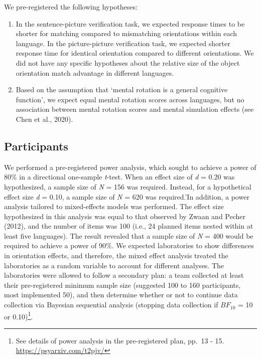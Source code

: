 \documentclass[
  man,floatsintext]{apa7}
\begin{document}
We pre-registered the following hypotheses:

\begin{enumerate}
\def\labelenumi{(\arabic{enumi})}
\item
  In the sentence-picture verification task, we expected response
  times to be shorter for matching compared to mismatching
  orientations within each language. In the picture-picture
  verification task, we expected shorter response time for identical
  orientation compared to different orientations. We did not have any
  specific hypotheses about the relative size of the object
  orientation match advantage in different languages.
\item
  Based on the assumption that `mental rotation is a general cognitive
  function', we expect equal mental rotation scores across languages,
  but no association between mental rotation scores and mental
  simulation effects (see Chen et al., 2020).
\end{enumerate}

\hypertarget{participants}{%
\subsection{Participants}\label{participants}}

We performed a pre-registered power analysis, which sought to achieve a
power of 80\% in a directional one-sample \emph{t}-test. When an effect size
of \emph{d} = 0.20 was hypothesized, a sample size of \emph{N} = 156 was required.
Instead, for a hypothetical effect size \emph{d} = 0.10, a sample size of \emph{N}
= 620 was required.'In addition, a power analysis tailored to
mixed-effects models was performed. The effect size hypothesized in this
analysis was equal to that observed by
Zwaan and Pecher (2012), and the number of items was 100
(i.e., 24 planned items nested within at least five languages). The
result revealed that a sample size of \emph{N} = 400 would be required to
achieve a power of 90\%. We expected laboratories to show differences in
orientation effects, and therefore, the mixed effect analysis treated
the laboratories as a random variable to account for different analyses.
The laboratories were allowed to follow a secondary plan: a team
collected at least their pre-registered minimum sample size (suggested
100 to 160 participants, most implemented 50), and then determine
whether or not to continue data collection via Bayesian sequential
analysis (stopping data collection if \(BF_{10}\) = 10 or 0.10)\footnote{See details of power analysis in the pre-registered plan, pp.~13 -
  15. \url{https://psyarxiv.com/t2pjv/}}.
\end{document}
